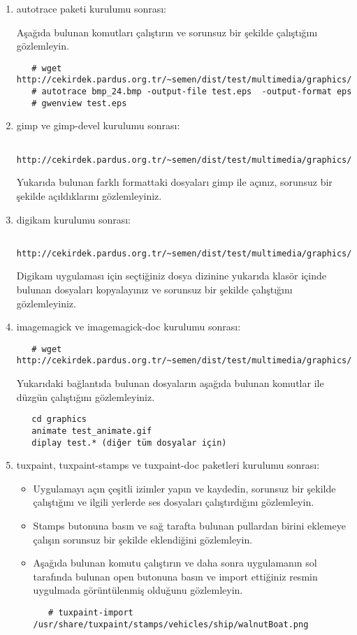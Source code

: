 \documentclass[a4paper,10pt]{article}
\begin{document}
\begin{enumerate}
\item autotrace paketi kurulumu sonrası:

Aşağıda bulunan komutları çalıştırın ve sorunsuz bir şekilde çalıştığını gözlemleyin.
  \begin{verbatim}
   # wget http://cekirdek.pardus.org.tr/~semen/dist/test/multimedia/graphics/bmp_24.bmp
   # autotrace bmp_24.bmp -output-file test.eps  -output-format eps
   # gwenview test.eps 
  \end{verbatim}

 \item gimp ve gimp-devel kurulumu sonrası:
  \begin{verbatim}
   http://cekirdek.pardus.org.tr/~semen/dist/test/multimedia/graphics/graphics.tar
  \end{verbatim}

 Yukarıda bulunan farklı formattaki dosyaları gimp ile açınız, sorunsuz bir şekilde açıldıklarını gözlemleyiniz.
\item digikam kurulumu sonrası:

  \begin{verbatim}
   http://cekirdek.pardus.org.tr/~semen/dist/test/multimedia/graphics/graphics.tar
  \end{verbatim}

 Digikam uygulaması için seçtiğiniz dosya dizinine yukarıda klasör içinde bulunan dosyaları kopyalayınız ve sorunsuz bir şekilde çalıştığını gözlemleyiniz.
\item imagemagick ve imagemagick-doc kurulumu sonrası:
  \begin{verbatim}
   # wget http://cekirdek.pardus.org.tr/~semen/dist/test/multimedia/graphics/graphics.tar
  \end{verbatim}

Yukarıdaki bağlantıda bulunan dosyaların aşağıda bulunan komutlar ile düzgün çalıştığını gözlemleyiniz.
  \begin{verbatim}
   cd graphics
   animate test_animate.gif
   diplay test.* (diğer tüm dosyalar için)
  \end{verbatim}
\item tuxpaint, tuxpaint-stamps ve tuxpaint-doc paketleri kurulumu sonrası:
  \begin{itemize}
   \item  Uygulamayı açın çeşitli izimler yapın ve kaydedin, sorunsuz bir şekilde çalıştığını ve ilgili yerlerde ses dosyaları çalıştırdığını gözlemleyin.
   \item Stamps butonuna basın ve sağ tarafta bulunan pullardan birini eklemeye çalışın sorunsuz bir şekilde eklendiğini gözlemleyin.
   \item Aşağıda bulunan komutu çalıştırın ve daha sonra uygulamanın sol tarafında bulunan open butonuna basın ve import ettiğiniz resmin uygulmada görüntülenmiş olduğunu gözlemleyin.
\begin{verbatim}
   # tuxpaint-import /usr/share/tuxpaint/stamps/vehicles/ship/walnutBoat.png
\end{verbatim} 
\end{itemize}


\end{enumerate}
\end{document}
